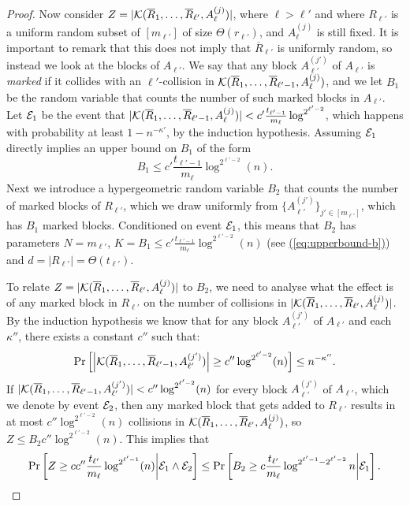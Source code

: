 \documentclass{theoretics}
\newcommand{\eq}[1]{\hyperref[eq:#1]{(\ref*{eq:#1})}}
\renewcommand{\>}{\rangle}
\newcommand{\<}{\langle}
\renewcommand{\(}{\left(}
\renewcommand{\)}{\right)}
\def\abs#1{\left| #1 \right|}
\begin{document}
\begin{proof}
Now consider $Z = |{\cal K}(\overline{R}_1,\dots,\overline{R}_{\ell'},A_{\ell}^{(j)})|$, where $\ell > \ell'$ and where $R_{\ell'}$ is a uniform random subset of $[m_{\ell'}]$ of size $\Theta(r_{\ell'})$, and $A_{\ell}^{(j)}$ is still fixed. It is important to remark that this does not imply that $\overline{R}_{\ell'}$ is uniformly random, so instead we look at the blocks of $A_{\ell'}$. We say that any block $A_{\ell'}^{(j')}$ of $A_{\ell'}$ is \emph{marked} if it collides with an $\ell'$-collision in ${\cal K}(\overline{R}_1,\dots,\overline{R}_{\ell'-1},A_{\ell}^{(j)})$, and we let $B_1$ be the random variable that counts the number of such marked blocks in $A_{\ell'}$. Let ${\cal E}_1$ be the event that $|{\cal K}(\overline{R}_1,\dots,\overline{R}_{\ell'-1},A_{\ell}^{(j)})| <  c'\frac{t_{\ell'-1}}{m_{\ell}}\log^{2^{\ell'-2}}$, which happens with probability at least $1-n^{-\kappa'}$, by the induction hypothesis. Assuming ${\cal E}_1$ directly implies an upper bound on $B_1$ of the form 
\begin{equation}\label{eq:upperbound-b}
	B_1\leq c'\frac{t_{\ell'-1}}{m_{\ell}}\log^{2^{\ell'-2}} (n).
\end{equation}
Next we introduce a hypergeometric random variable $B_2$ that counts the number of marked blocks of $R_{\ell'}$, which we draw uniformly from $\{A_{\ell'}^{(j')}\}_{j'\in [m_{\ell'}]}$, which has $B_1$ marked blocks. Conditioned on event ${\cal E}_1$, this means that $B_2$ has parameters $N = m_{\ell'}$, $K = B_1 \leq c'\frac{t_{\ell'-1}}{m_{\ell}}\log^{2^{\ell'-2}} (n)$ (see \eq{upperbound-b}) and $d=|R_{\ell'}|=\Theta(t_{\ell'})$.

To relate $Z = |{\cal K}(\overline{R}_1,\dots,\overline{R}_{\ell'},A_{\ell}^{(j)})|$ to $B_2$, we need to analyse what the effect is of any marked block in $R_{\ell'}$ on the number of collisions in $|{\cal K}(\overline{R}_1,\dots,\overline{R}_{\ell'},A_{\ell}^{(j)})|$. By the induction hypothesis we know that for any block $A_{\ell'}^{(j')}$ of $A_{\ell'}$ and each $\kappa''$, there exists a constant $c''$ such that:
$$\Pr\left[\abs{{\cal K}(\overline{R}_1,\dots,\overline{R}_{\ell'-1},A_{\ell'}^{(j')})}\geq c''\log^{2^{\ell'-2}} (n)\right]\leq n^{-\kappa''}.$$  
If $|{\cal K}(\overline{R}_1,\dots,\overline{R}_{\ell'-1},A_{\ell'}^{(j')})| <  c''\log^{2^{\ell'-2}} (n)$ for every block $A_{\ell'}^{(j')}$ of $A_{\ell'}$, which we denote by event ${\cal E}_2$, then any marked block that gets added to $R_{\ell'}$ results in at most $c''\log^{2^{\ell'-2}} (n)$ collisions in ${\cal K}(\overline{R}_1,\dots,\overline{R}_{\ell'},A_{\ell}^{(j)})$, so $Z \leq B_2c''\log^{2^{\ell'-2}}(n) $. This implies that
\begin{equation}\label{eq:Z-B}
	\Pr\left[Z \geq cc''\frac{t_{\ell'}}{m_{\ell}}\log^{2^{\ell'-1}} (n)\middle| {\cal E}_1 \wedge {\cal E}_2 \right] \leq \Pr\left[B_2 \geq c\frac{t_{\ell'}}{m_{\ell}}\log^{2^{\ell'-1}-2^{\ell'-2}} n\middle| {\cal E}_1\right].
\end{equation}


\end{proof}
\end{document}
